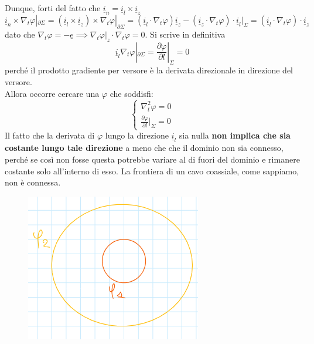 \documentclass{book}
\begin{document}
        Dunque, forti del fatto che $\underline{i}_{n} = \underline{i}_{l} \times \underline{i}_{z}$
        \begin{equation}
            \underline{i}_{n} \times \nabla_{t} \varphi |_{\partial \Sigma} = (\underline{i}_{l} \times \underline{i}_{z}) \times \nabla_{t} \varphi |_{\partial \Sigma} = (\underline{i}_{l} \cdot \nabla_{t} \varphi) \underline{i}_{z} -
            (\underline{i}_{z} \cdot  \nabla_{t}\varphi) \cdot \underline{i}_{l}|_{\Sigma} = (\underline{i}_{l} \cdot \nabla_{t} \varphi ) \cdot \underline{i}_{z}
        \end{equation}
        dato che $\nabla_{t} \varphi = - \underline{e} \implies \nabla_{t}\varphi|_{z} \cdot \nabla_{t} \varphi = 0$. Si scrive in definitiva 
        \begin{equation}
            \underline{i}_{l} \nabla_{t} \varphi |_{\partial \Sigma} = \frac{\partial \varphi}{\partial l}|_{\Sigma} = 0
        \end{equation}
        perché il prodotto gradiente per versore è la derivata direzionale in direzione del versore. \\ 
        Allora occorre cercare una $\varphi$ che soddisfi:
        \begin{equation}
            \begin{cases}
                \nabla_{t} ^{2} \varphi = 0 \\
                \displaystyle \frac{\partial \varphi}{\partial l}|_{\Sigma} = 0
            \end{cases}
        \end{equation}
        Il fatto che la derivata di $\varphi$ lungo la direzione  $\underline{i}_{l}$ sia nulla \textbf{non implica che sia costante lungo tale direzione} a meno che che il dominio non sia connesso,
        perché se così non fosse questa potrebbe variare al di fuori del dominio e rimanere costante solo all'interno di esso. La frontiera di un cavo coassiale, come sappiamo, non è connessa.\\
        \begin{figure}[h!]
            \center  
            \includegraphics[width=0.6\linewidth]{img/Chapter_three/Chapt3img7.png}
        \end{figure}
\end{document}
